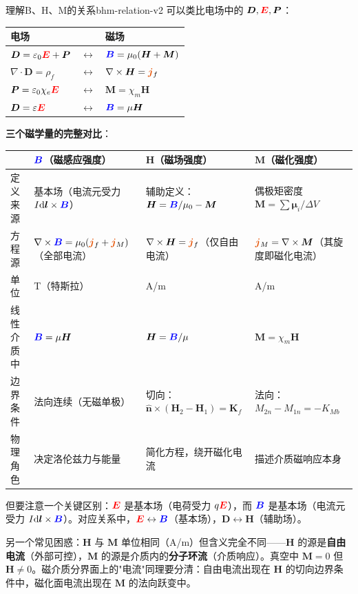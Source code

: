 \documentclass[11pt,a4paper,openany,oneside]{book}
\newcommand{\diff}{\mathrm{d}}
\newcommand{\vecE}{\textcolor{red}{\vect{E}}}
\newcommand{\vecB}{\textcolor{blue}{\vect{B}}}
\newcommand{\vecJ}{\textcolor{cororange}{\vect{j}}}
\newcommand{\eps}{\varepsilon}
\newcommand{\muz}{\mu_0}
\newcommand{\vect}[1]{\bm{#1}}
\newcommand{\unitvec}[1]{\hat{\vect{#1}}}
\newcommand{\curl}{\nabla\times}
\newcommand{\divg}{\nabla\cdot}
\begin{document}
\begin{insight}{理解B、H、M的关系}{bhm-relation-v2}
可以类比电场中的 $\vect{D}, \vecE, \vect{P}$：
\begin{center}
\begin{tabular}{@{}lll@{}}
\toprule
\textbf{电场} & & \textbf{磁场} \\
\midrule
$\vect{D} = \eps_0\vecE + \vect{P}$ & $\longleftrightarrow$ & $\vecB = \muz(\vect{H} + \vect{M})$ \\
$\divg\vect{D} = \rho_f$ & $\longleftrightarrow$ & $\curl\vect{H} = \vecJ_f$ \\
$\vect{P} = \eps_0\chi_e\vecE$ & $\longleftrightarrow$ & $\vect{M} = \chi_m\vect{H}$ \\
$\vect{D} = \eps\vecE$ & $\longleftrightarrow$ & $\vecB = \mu\vect{H}$ \\
\bottomrule
\end{tabular}
\end{center}

\textbf{三个磁学量的完整对比}：
\begin{center}
\small
\begin{tabular}{@{}>{\raggedright\arraybackslash}p{2.2cm}>{\raggedright\arraybackslash}p{3.6cm}>{\raggedright\arraybackslash}p{3.2cm}>{\raggedright\arraybackslash}p{3.6cm}@{}}
\toprule
 & $\vecB$（磁感应强度） & $\vect{H}$（磁场强度） & $\vect{M}$（磁化强度） \\
\midrule
定义来源 & 基本场（电流元受力 $I\diff\vect{l}\times\vecB$） & 辅助定义：$\vect{H} = \vecB/\muz - \vect{M}$ & 偶极矩密度 $\vect{M} = \sum\vect{\mu}_i/\Delta V$ \\
\midrule
方程源 & $\curl\vecB = \muz(\vecJ_f+\vecJ_M)$（全部电流） & $\curl\vect{H} = \vecJ_f$（仅自由电流） & $\vecJ_M = \curl\vect{M}$（其旋度即磁化电流） \\
\midrule
单位 & \si{T}（特斯拉） & \si{A/m} & \si{A/m} \\
\midrule
线性介质中 & $\vecB = \mu\vect{H}$ & $\vect{H} = \vecB/\mu$ & $\vect{M} = \chi_m\vect{H}$ \\
\midrule
边界条件 & 法向连续（无磁单极） & 切向：$\unitvec{n}\times(\vect{H}_2-\vect{H}_1)=\vect{K}_f$ & 法向：$M_{2n}-M_{1n}=-K_{Mb}$ \\
\midrule
物理角色 & 决定洛伦兹力与能量 & 简化方程，绕开磁化电流 & 描述介质磁响应本身 \\
\bottomrule
\end{tabular}
\end{center}

但要注意一个关键区别：$\vecE$ 是基本场（电荷受力 $q\vecE$），而 $\vecB$ 是基本场（电流元受力 $I\diff\vect{l}\times\vecB$）。对应关系中，$\vecE \leftrightarrow \vecB$（基本场），$\vect{D} \leftrightarrow \vect{H}$（辅助场）。

另一个常见困惑：$\vect{H}$ 与 $\vect{M}$ 单位相同（\si{A/m}）但含义完全不同——$\vect{H}$ 的源是\textbf{自由电流}（外部可控），$\vect{M}$ 的源是介质内的\textbf{分子环流}（介质响应）。真空中 $\vect{M}=0$ 但 $\vect{H}\neq 0$。磁介质分界面上的"电流"同理要分清：自由电流出现在 $\vect{H}$ 的切向边界条件中，磁化面电流出现在 $\vect{M}$ 的法向跃变中。
\end{insight}
\end{document}
